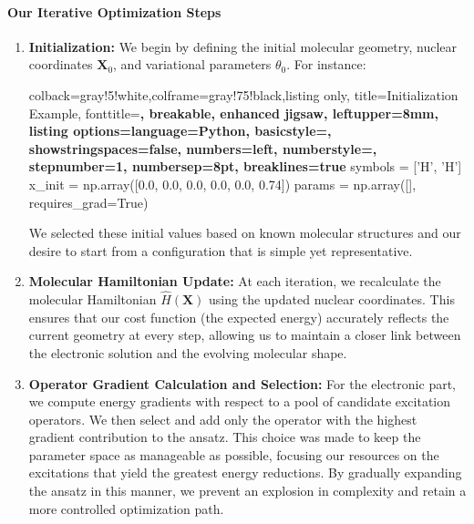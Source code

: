 \paragraph{Our Iterative Optimization Steps}
\begin{enumerate}
    \item \textbf{Initialization:}
    We begin by defining the initial molecular geometry, nuclear coordinates \(\mathbf{X}_0\), and variational parameters \(\theta_0\). For instance:
    \begin{tcblisting}{colback=gray!5!white,colframe=gray!75!black,listing only,
      title=Initialization Example, fonttitle=\bfseries, breakable, enhanced jigsaw, leftupper=8mm,
      listing options={language=Python, basicstyle=\ttfamily\small,
      showstringspaces=false, numbers=left, numberstyle=\footnotesize, stepnumber=1, numbersep=8pt, breaklines=true}}
symbols = ['H', 'H']
x_init = np.array([0.0, 0.0, 0.0, 0.0, 0.0, 0.74])
params = np.array([], requires_grad=True)
    \end{tcblisting}
    We selected these initial values based on known molecular structures and our desire to start from a configuration that is simple yet representative.

    \item \textbf{Molecular Hamiltonian Update:}
    At each iteration, we recalculate the molecular Hamiltonian \(\hat{H}(\mathbf{X})\) using the updated nuclear coordinates. This ensures that our cost function (the expected energy) accurately reflects the current geometry at every step, allowing us to maintain a closer link between the electronic solution and the evolving molecular shape.

    \item \textbf{Operator Gradient Calculation and Selection:}
    For the electronic part, we compute energy gradients with respect to a pool of candidate excitation operators. We then select and add only the operator with the highest gradient contribution to the ansatz. This choice was made to keep the parameter space as manageable as possible, focusing our resources on the excitations that yield the greatest energy reductions. By gradually expanding the ansatz in this manner, we prevent an explosion in complexity and retain a more controlled optimization path.


\end{enumerate}
